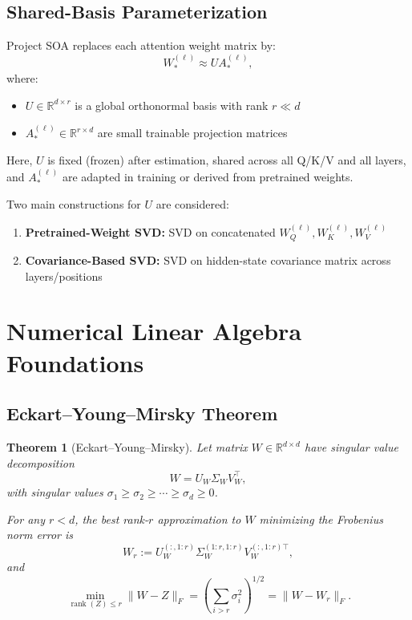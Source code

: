 \documentclass[11pt]{article}
\newtheorem{theorem}{Theorem}[section]
\theoremstyle{definition}
\begin{document}
\subsection{Shared-Basis Parameterization}

Project SOA replaces each attention weight matrix by:
\[
W_*^{(\ell)} \approx U A_*^{(\ell)},
\]
where:
\begin{itemize}
    \item \(U \in \mathbb{R}^{d \times r}\) is a global orthonormal basis with rank \(r \ll d\)
    \item \(A_*^{(\ell)} \in \mathbb{R}^{r \times d}\) are small trainable projection matrices
\end{itemize}
Here, \(U\) is fixed (frozen) after estimation, shared across all Q/K/V and all layers, and \(A_*^{(\ell)}\) are adapted in training or derived from pretrained weights.

Two main constructions for \(U\) are considered:
\begin{enumerate}
    \item \textbf{Pretrained-Weight SVD:} SVD on concatenated \(W_Q^{(\ell)}, W_K^{(\ell)}, W_V^{(\ell)}\)
    \item \textbf{Covariance-Based SVD:} SVD on hidden-state covariance matrix across layers/positions
\end{enumerate}

\section{Numerical Linear Algebra Foundations}

\subsection{Eckart–Young–Mirsky Theorem}

\begin{theorem}[Eckart–Young–Mirsky]
Let matrix \(W \in \mathbb{R}^{d \times d}\) have singular value decomposition
\[
W = U_W \Sigma_W V_W^\top,
\]
with singular values \(\sigma_1 \ge \sigma_2 \ge \cdots \ge \sigma_d \ge 0\).

For any \(r < d\), the best rank-\(r\) approximation to \(W\) minimizing the Frobenius norm error is
\[
W_r := U_W^{(:,1:r)} \Sigma_W^{(1:r,1:r)} V_W^{(:,1:r)\top},
\]
and
\[
\min_{\operatorname{rank}(Z) \le r} \|W - Z\|_F = \left( \sum_{i > r} \sigma_i^2 \right)^{1/2} = \|W - W_r\|_F.
\]
\end{theorem}
\end{document}
